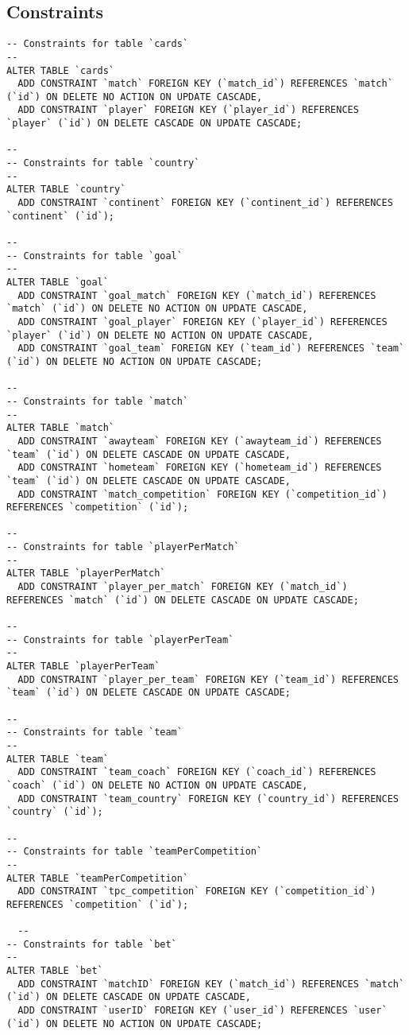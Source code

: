 \documentclass[11pt, a4paper]{article}
\begin{document}
\subsection{Constraints}
\begin{lstlisting}
-- Constraints for table `cards`
--
ALTER TABLE `cards`
  ADD CONSTRAINT `match` FOREIGN KEY (`match_id`) REFERENCES `match` (`id`) ON DELETE NO ACTION ON UPDATE CASCADE,
  ADD CONSTRAINT `player` FOREIGN KEY (`player_id`) REFERENCES `player` (`id`) ON DELETE CASCADE ON UPDATE CASCADE;

--
-- Constraints for table `country`
--
ALTER TABLE `country`
  ADD CONSTRAINT `continent` FOREIGN KEY (`continent_id`) REFERENCES `continent` (`id`);

--
-- Constraints for table `goal`
--
ALTER TABLE `goal`
  ADD CONSTRAINT `goal_match` FOREIGN KEY (`match_id`) REFERENCES `match` (`id`) ON DELETE NO ACTION ON UPDATE CASCADE,
  ADD CONSTRAINT `goal_player` FOREIGN KEY (`player_id`) REFERENCES `player` (`id`) ON DELETE NO ACTION ON UPDATE CASCADE,
  ADD CONSTRAINT `goal_team` FOREIGN KEY (`team_id`) REFERENCES `team` (`id`) ON DELETE NO ACTION ON UPDATE CASCADE;

--
-- Constraints for table `match`
--
ALTER TABLE `match`
  ADD CONSTRAINT `awayteam` FOREIGN KEY (`awayteam_id`) REFERENCES `team` (`id`) ON DELETE CASCADE ON UPDATE CASCADE,
  ADD CONSTRAINT `hometeam` FOREIGN KEY (`hometeam_id`) REFERENCES `team` (`id`) ON DELETE CASCADE ON UPDATE CASCADE,
  ADD CONSTRAINT `match_competition` FOREIGN KEY (`competition_id`) REFERENCES `competition` (`id`);

--
-- Constraints for table `playerPerMatch`
--
ALTER TABLE `playerPerMatch`
  ADD CONSTRAINT `player_per_match` FOREIGN KEY (`match_id`) REFERENCES `match` (`id`) ON DELETE CASCADE ON UPDATE CASCADE;

--
-- Constraints for table `playerPerTeam`
--
ALTER TABLE `playerPerTeam`
  ADD CONSTRAINT `player_per_team` FOREIGN KEY (`team_id`) REFERENCES `team` (`id`) ON DELETE CASCADE ON UPDATE CASCADE;

--
-- Constraints for table `team`
--
ALTER TABLE `team`
  ADD CONSTRAINT `team_coach` FOREIGN KEY (`coach_id`) REFERENCES `coach` (`id`) ON DELETE NO ACTION ON UPDATE CASCADE,
  ADD CONSTRAINT `team_country` FOREIGN KEY (`country_id`) REFERENCES `country` (`id`);

--
-- Constraints for table `teamPerCompetition`
--
ALTER TABLE `teamPerCompetition`
  ADD CONSTRAINT `tpc_competition` FOREIGN KEY (`competition_id`) REFERENCES `competition` (`id`);

  --
-- Constraints for table `bet`
--
ALTER TABLE `bet`
  ADD CONSTRAINT `matchID` FOREIGN KEY (`match_id`) REFERENCES `match` (`id`) ON DELETE CASCADE ON UPDATE CASCADE,
  ADD CONSTRAINT `userID` FOREIGN KEY (`user_id`) REFERENCES `user` (`id`) ON DELETE NO ACTION ON UPDATE CASCADE;

\end{lstlisting}
\end{document}
